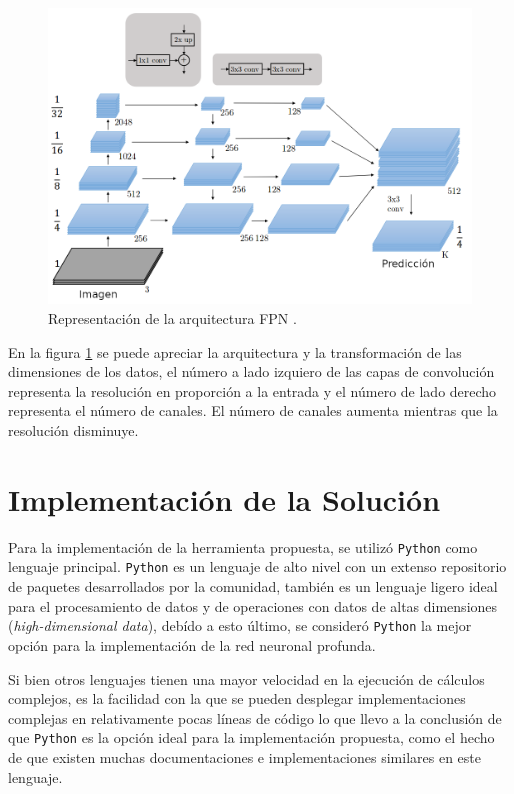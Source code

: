 \begin{figure}[h]
    \centering
    \includegraphics[scale=0.55]{Figuras/fpn_ar_esp.png}
    \caption{Representación de la arquitectura FPN \citep{fpn_2}.}
    \label{fig:fpn_map}
\end{figure}

En la figura \ref{fig:fpn_map} se puede apreciar la arquitectura y la transformación de las dimensiones de los datos, el número a lado izquiero de las capas de convolución representa la resolución en proporción a la entrada y el número de lado derecho representa el número de canales. El número de canales aumenta mientras que la resolución disminuye.

\section{Implementación de la Solución}
Para la implementación de la herramienta propuesta, se utilizó \texttt{Python} como lenguaje principal. \texttt{Python} es un lenguaje de alto nivel con un extenso repositorio de paquetes desarrollados por la comunidad, también es un lenguaje ligero ideal para el procesamiento de datos y de operaciones con datos de altas dimensiones (\emph{high-dimensional data}), debído a esto último, se consideró \texttt{Python} la mejor opción para la implementación de la red neuronal profunda.

Si bien otros lenguajes tienen una mayor velocidad en la ejecución de cálculos complejos, es la facilidad con la que se pueden desplegar implementaciones complejas en relativamente pocas líneas de código lo que llevo a la conclusión de que \texttt{Python} es la opción ideal para la implementación propuesta, como el hecho de que existen muchas documentaciones e implementaciones similares en este lenguaje.

